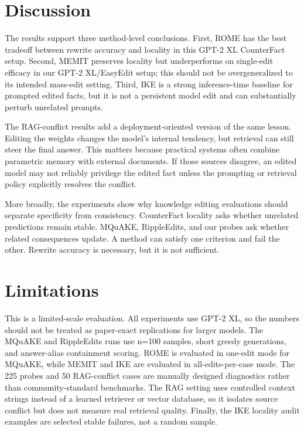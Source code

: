 \documentclass[11pt]{article}
\begin{document}
\section{Discussion}

The results support three method-level conclusions. First, ROME has the best tradeoff between rewrite accuracy and locality in this GPT-2 XL CounterFact setup. Second, MEMIT preserves locality but underperforms on single-edit efficacy in our GPT-2 XL/EasyEdit setup; this should not be overgeneralized to its intended mass-edit setting. Third, IKE is a strong inference-time baseline for prompted edited facts, but it is not a persistent model edit and can substantially perturb unrelated prompts.

The RAG-conflict results add a deployment-oriented version of the same lesson. Editing the weights changes the model's internal tendency, but retrieval can still steer the final answer. This matters because practical systems often combine parametric memory with external documents. If those sources disagree, an edited model may not reliably privilege the edited fact unless the prompting or retrieval policy explicitly resolves the conflict.

More broadly, the experiments show why knowledge editing evaluations should separate specificity from consistency. CounterFact locality asks whether unrelated predictions remain stable. MQuAKE, RippleEdits, and our probes ask whether related consequences update. A method can satisfy one criterion and fail the other. Rewrite accuracy is necessary, but it is not sufficient.

\section{Limitations}

This is a limited-scale evaluation. All experiments use GPT-2 XL, so the numbers should not be treated as paper-exact replications for larger models. The MQuAKE and RippleEdits runs use n=100 samples, short greedy generations, and answer-alias containment scoring. ROME is evaluated in one-edit mode for MQuAKE, while MEMIT and IKE are evaluated in all-edits-per-case mode. The 225 probes and 50 RAG-conflict cases are manually designed diagnostics rather than community-standard benchmarks. The RAG setting uses controlled context strings instead of a learned retriever or vector database, so it isolates source conflict but does not measure real retrieval quality. Finally, the IKE locality audit examples are selected stable failures, not a random sample.
\end{document}
